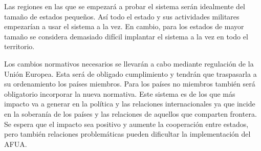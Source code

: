 Las regiones en las que se empezará a probar el sistema serán idealmente del tamaño de estados pequeños. Así todo el estado y sus actividades militares empezarían a usar el sistema a la vez. En cambio, para los estados de mayor tamaño se considera demasiado difícil implantar el sistema a la vez en todo el territorio.

Los cambios normativos necesarios se llevarán a cabo mediante regulación de la Unión Europea. Esta será de obligado cumplimiento y tendrán que traspasarla a su ordenamiento los países miembros. Para los países no miembros también será obligatorio incorporar la nueva normativa. Este sistema es de los que más impacto va a generar en la política y las relaciones internacionales ya que incide en la soberanía de los países y las relaciones de aquellos que comparten frontera. Se espera que el impacto sea positivo y aumente la cooperación entre estados, pero también relaciones problemáticas pueden dificultar la implementación del AFUA.

\cbend
